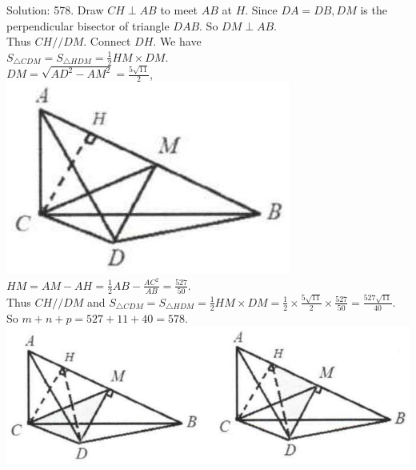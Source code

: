 \documentclass{article}
\begin{document}
Solution: 578.
Draw \(C H \perp A B\) to meet \(A B\) at \(H\). Since \(D A=D B, D M\) is the perpendicular bisector of triangle \(D A B\). So \(D M \perp A B\).\\
Thus \(C H / / D M\). Connect \(D H\). We have\\
\(S_{\triangle C D M}=S_{\triangle H D M}=\frac{1}{2} H M \times D M\).\\
\(D M=\sqrt{A D^{2}-A M^{2}}=\frac{5 \sqrt{11}}{2}\),\\
\centering
\includegraphics[width=\textwidth]{images/086(1).jpg}\\
\(H M=A M-A H=\frac{1}{2} A B-\frac{A C^{2}}{A B}=\frac{527}{50}\).\\
Thus \(C H / / D M\) and \(S_{\triangle C D M}=S_{\triangle H D M}=\frac{1}{2} H M \times D M=\frac{1}{2} \times \frac{5 \sqrt{11}}{2} \times \frac{527}{50}=\frac{527 \sqrt{11}}{40}\).\\
So \(m+n+p=527+11+40=578\).\\
\centering
\includegraphics[width=\textwidth]{images/086(2).jpg}
\end{document}
